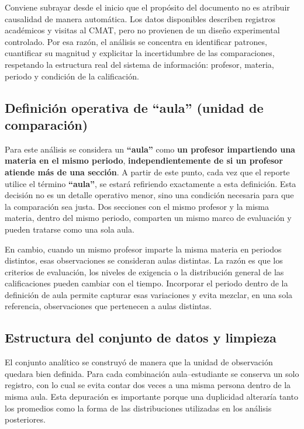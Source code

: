 \documentclass[10pt,letterpaper]{article} %
\numberwithin{figure}{subsection}
\begin{document}
Conviene subrayar desde el inicio que el propósito del documento no es atribuir causalidad de manera automática. Los datos disponibles describen registros académicos y visitas al CMAT, pero no provienen de un diseño experimental controlado. Por esa razón, el análisis se concentra en identificar patrones, cuantificar su magnitud y explicitar la incertidumbre de las comparaciones, respetando la estructura real del sistema de información: profesor, materia, periodo y condición de la calificación.

\subsection{Definición operativa de ``aula'' (unidad de comparación)}
Para este análisis se considera un \textbf{``aula''} como \textbf{un profesor impartiendo una materia en el mismo periodo}, \textbf{independientemente de si un profesor atiende más de una sección}. A partir de este punto, cada vez que el reporte utilice el término \textbf{``aula''}, se estará refiriendo exactamente a esta definición. Esta decisión no es un detalle operativo menor, sino una condición necesaria para que la comparación sea justa. Dos secciones con el mismo profesor y la misma materia, dentro del mismo periodo, comparten un mismo marco de evaluación y pueden tratarse como una sola aula.

En cambio, cuando un mismo profesor imparte la misma materia en periodos distintos, esas observaciones se consideran aulas distintas. La razón es que los criterios de evaluación, los niveles de exigencia o la distribución general de las calificaciones pueden cambiar con el tiempo. Incorporar el periodo dentro de la definición de aula permite capturar esas variaciones y evita mezclar, en una sola referencia, observaciones que pertenecen a aulas distintas.

\subsection{Estructura del conjunto de datos y limpieza}
El conjunto analítico se construyó de manera que la unidad de observación quedara bien definida. Para cada combinación aula--estudiante se conserva un solo registro, con lo cual se evita contar dos veces a una misma persona dentro de la misma aula. Esta depuración es importante porque una duplicidad alteraría tanto los promedios como la forma de las distribuciones utilizadas en los análisis posteriores.
\end{document}
